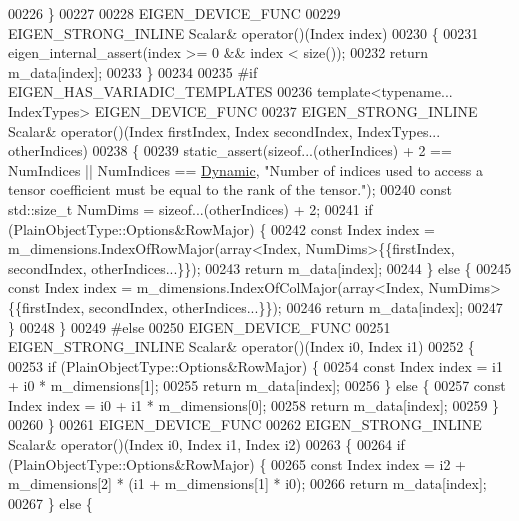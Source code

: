\begin{DoxyCode}
00226     \}
00227 
00228     EIGEN\_DEVICE\_FUNC
00229     EIGEN\_STRONG\_INLINE Scalar& operator()(Index index)
00230     \{
00231       eigen\_internal\_assert(index >= 0 && index < size());
00232       \textcolor{keywordflow}{return} m\_data[index];
00233     \}
00234 
00235 \textcolor{preprocessor}{#if EIGEN\_HAS\_VARIADIC\_TEMPLATES}
00236     \textcolor{keyword}{template}<\textcolor{keyword}{typename}... IndexTypes> EIGEN\_DEVICE\_FUNC
00237     EIGEN\_STRONG\_INLINE Scalar& operator()(Index firstIndex, Index secondIndex, IndexTypes... otherIndices)
00238     \{
00239       static\_assert(\textcolor{keyword}{sizeof}...(otherIndices) + 2 == NumIndices || NumIndices == 
      \hyperlink{namespace_eigen_ad81fa7195215a0ce30017dfac309f0b2}{Dynamic}, \textcolor{stringliteral}{"Number of indices used to access a tensor coefficient must be equal to the rank of the
       tensor."});
00240       \textcolor{keyword}{const} std::size\_t NumDims = \textcolor{keyword}{sizeof}...(otherIndices) + 2;
00241       \textcolor{keywordflow}{if} (PlainObjectType::Options&RowMajor) \{
00242         \textcolor{keyword}{const} Index index = m\_dimensions.IndexOfRowMajor(array<Index, NumDims>\{\{firstIndex, secondIndex, 
      otherIndices...\}\});
00243         \textcolor{keywordflow}{return} m\_data[index];
00244       \} \textcolor{keywordflow}{else} \{
00245         \textcolor{keyword}{const} Index index = m\_dimensions.IndexOfColMajor(array<Index, NumDims>\{\{firstIndex, secondIndex, 
      otherIndices...\}\});
00246         \textcolor{keywordflow}{return} m\_data[index];
00247       \}
00248     \}
00249 \textcolor{preprocessor}{#else}
00250     EIGEN\_DEVICE\_FUNC
00251     EIGEN\_STRONG\_INLINE Scalar& operator()(Index i0, Index i1)
00252     \{
00253        \textcolor{keywordflow}{if} (PlainObjectType::Options&RowMajor) \{
00254          \textcolor{keyword}{const} Index index = i1 + i0 * m\_dimensions[1];
00255         \textcolor{keywordflow}{return} m\_data[index];
00256       \} \textcolor{keywordflow}{else} \{
00257         \textcolor{keyword}{const} Index index = i0 + i1 * m\_dimensions[0];
00258         \textcolor{keywordflow}{return} m\_data[index];
00259       \}
00260     \}
00261     EIGEN\_DEVICE\_FUNC
00262     EIGEN\_STRONG\_INLINE Scalar& operator()(Index i0, Index i1, Index i2)
00263     \{
00264        \textcolor{keywordflow}{if} (PlainObjectType::Options&RowMajor) \{
00265          \textcolor{keyword}{const} Index index = i2 + m\_dimensions[2] * (i1 + m\_dimensions[1] * i0);
00266         \textcolor{keywordflow}{return} m\_data[index];
00267       \} \textcolor{keywordflow}{else} \{

\end{DoxyCode}
